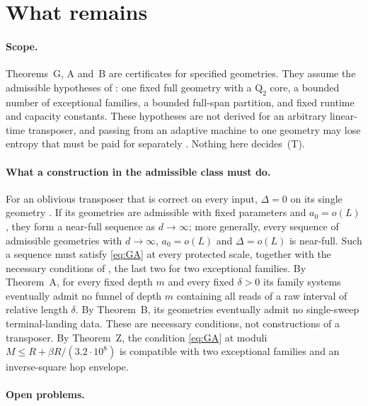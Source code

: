 \section{What remains}\label{sec:remains}

\paragraph{Scope.}
Theorems~G, A and~B are certificates for specified geometries. They assume the
admissible hypotheses of \cite[Definition~2.2]{SourceCovers2026}: one fixed full
geometry with a $\mathrm Q_2$ core, a bounded number of exceptional families, a bounded
full-span partition, and fixed runtime and capacity constants. These hypotheses are not
derived for an arbitrary linear-time transposer, and passing from an adaptive machine
to one geometry may lose entropy that must be paid for separately
\cite[Sections~1.1 and~9.3]{SourceCovers2026}. Nothing here decides~(T).

\paragraph{What a construction in the admissible class must do.}
For an oblivious transposer that is correct on every input, $\Delta=0$ on its single
geometry \cite[Section~1.1]{SourceCovers2026}. If its geometries are admissible with
fixed parameters and $a_0=o(L)$, they form a near-full sequence as $d\to\infty$; more
generally, every sequence of admissible geometries with $d\to\infty$, $a_0=o(L)$ and
$\Delta=o(L)$ is near-full. Such a sequence must satisfy
\eqref{eq:GA} at every protected scale, together with the necessary conditions of
\cite[Theorems~4.2 and~4.6 and Corollaries~4.8 and~5.3]{SourceCovers2026}, the last two
for two exceptional families. By Theorem~A, for every fixed depth $m$ and every fixed
$\delta>0$ its family systems eventually admit no funnel of depth $m$ containing all
reads of a raw interval of relative length $\delta$. By Theorem~B, its geometries
eventually admit no single-sweep terminal-landing data. These are necessary conditions,
not constructions of a transposer. By Theorem~Z, the condition \eqref{eq:GA} at moduli
$M\le R+\beta R/(3.2\cdot10^8)$ is compatible with two exceptional families and an
inverse-square hop envelope.

\paragraph{Open problems.}


